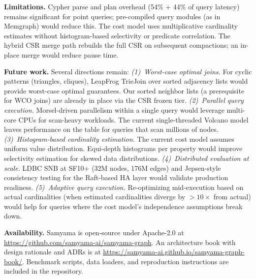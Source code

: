 \documentclass[sigconf, nonacm]{acmart}
\begin{document}
\textbf{Limitations.}
Cypher parse and plan overhead (54\% + 44\% of query latency) remains significant for point queries; pre-compiled query modules (as in Memgraph) would reduce this.
The cost model uses multiplicative cardinality estimates without histogram-based selectivity or predicate correlation.
The hybrid CSR merge path rebuilds the full CSR on subsequent compactions; an in-place merge would reduce pause time.

\textbf{Future work.}
Several directions remain:
\emph{(1)~Worst-case optimal joins.}
For cyclic patterns (triangles, cliques), LeapFrog TrieJoin over sorted adjacency lists would provide worst-case optimal guarantees.
Our sorted neighbor lists (a prerequisite for WCO joins) are already in place via the CSR frozen tier.
\emph{(2)~Parallel query execution.}
Morsel-driven parallelism within a single query would leverage multi-core CPUs for scan-heavy workloads.
The current single-threaded Volcano model leaves performance on the table for queries that scan millions of nodes.
\emph{(3)~Histogram-based cardinality estimation.}
The current cost model assumes uniform value distribution.
Equi-depth histograms per property would improve selectivity estimation for skewed data distributions.
\emph{(4)~Distributed evaluation at scale.}
LDBC SNB at SF10+ (32M nodes, 176M edges) and Jepsen-style consistency testing for the Raft-based HA layer would validate production readiness.
\emph{(5)~Adaptive query execution.}
Re-optimizing mid-execution based on actual cardinalities (when estimated cardinalities diverge by $>10\times$ from actual) would help for queries where the cost model's independence assumptions break down.

\textbf{Availability.}
Samyama is open-source under Apache-2.0 at \url{https://github.com/samyama-ai/samyama-graph}.
An architecture book with design rationale and ADRs is at \url{https://samyama-ai.github.io/samyama-graph-book/}.
Benchmark scripts, data loaders, and reproduction instructions are included in the repository.

\balance


\end{document}
